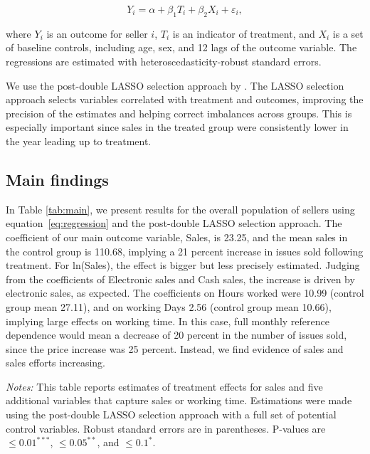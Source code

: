 \documentclass[12pt]{article}
\begin{document}
\begin{equation}
    Y_i = \alpha + \beta_1 T_i + \beta_2 X_i + \varepsilon_i,
    \label{eq:regression}
\end{equation}

where $Y_i$ is an outcome for seller $i$, $T_i$ is an indicator of treatment, and $X_i$ is a set of baseline controls, including age, sex, and 12 lags of the outcome variable. The regressions are estimated with heteroscedasticity-robust standard errors.

We use the post-double LASSO selection approach by \citet{belloni2014inference}. The LASSO selection approach selects variables correlated with treatment and outcomes, improving the precision of the estimates and helping correct imbalances across groups. This is especially important since sales in the treated group were consistently lower in the year leading up to treatment.

\subsection{Main findings}
In Table \ref{tab:main}, we present results for the overall population of sellers using equation~\eqref{eq:regression} and the post-double LASSO selection approach. The coefficient of our main outcome variable, Sales, is 23.25, and the mean sales in the control group is 110.68, implying a 21 percent increase in issues sold following treatment. For ln(Sales), the effect is bigger but less precisely estimated. Judging from the coefficients of Electronic sales and Cash sales, the increase is driven by electronic sales, as expected. The coefficients on Hours worked were 10.99 (control group mean 27.11), and on working Days 2.56 (control group mean 10.66), implying large effects on working time. In this case, full monthly reference dependence would mean a decrease of 20 percent in the number of issues sold, since the price increase was 25 percent. Instead, we find evidence of sales and sales efforts increasing.

\begin{table}[H]
\centering
\begin{threeparttable}
\caption{\label{tab:main} Main results}
\normalsize   %

\begin{tablenotes}[flushleft]
\small
\item \textit{Notes:} This table reports estimates of treatment effects for sales and five additional variables that capture sales or working time. Estimations were made using the post-double LASSO selection approach with a full set of potential control variables. Robust standard errors are in parentheses. P-values are $\leq 0.01^{***}$,  $\leq 0.05^{**}$, and $\leq 0.1^{*}$.
\end{tablenotes}
\end{threeparttable}
\end{table}
\end{document}
